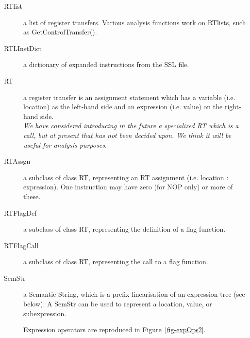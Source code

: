 \begin{description}
\item[RTlist] a list of register transfers. Various analysis
    functions work on RTlists, such as GetControlTransfer().

\item[RTLInstDict] a dictionary of expanded instructions from the SSL
    file.

\item[RT] a register transfer is an assignment statement
    which has a variable (i.e. location) as the left-hand
    side and an expression (i.e. value) on the right-hand side. \\
    {\it We have considered introducing in the future a specialized
    RT which is a call, but at present that has not been decided
    upon.  We think it will be useful for analysis purposes. }

\item[RTAssgn] a subclass of class RT, representing an RT assignment
    (i.e. location := expression). One instruction may have zero
    (for NOP only) or more of these.

\item[RTFlagDef] a subclass of class RT, representing the definition
     of a flag function.

\item[RTFlagCall] a subclass of class RT, representing the call to a
    flag function.

\item[SemStr] a Semantic String, which is a prefix linearisation of an
    expression tree (see below).
    A SemStr can be used to represent a location, value, or subexpression.

    Expression operators are reproduced in Figure~\ref{fig-expOps2}.

\end{description}

